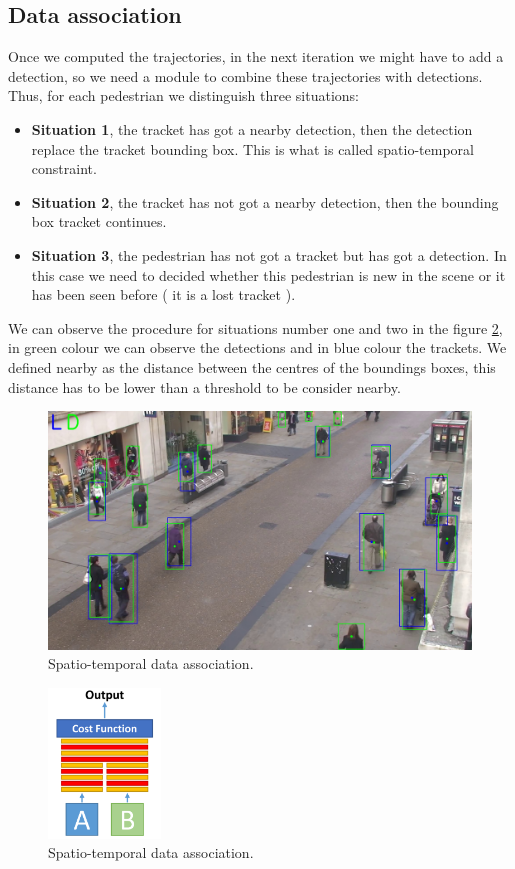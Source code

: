 \subsection{Data association}

Once we computed the trajectories, in the next iteration we might have to add a detection, so we need a module to combine these trajectories with detections. Thus, for each pedestrian we distinguish three situations:

\begin{itemize}



\item \textbf{Situation 1}, the tracket has got a nearby detection, then the detection replace the tracket bounding box. This is what is called spatio-temporal constraint.

\item \textbf{Situation 2}, the tracket has not got a nearby detection, then the bounding box tracket continues.

\item \textbf{Situation 3}, the pedestrian has not got a tracket but has got a detection. In this case we need to decided whether this pedestrian is new in the scene or it has been seen before ( it is a lost tracket ).

\end{itemize}

We can observe the procedure for situations number one and two in the figure \ref{data1}, in green colour we can observe the detections and in blue colour the trackets. We defined nearby as the distance between the centres of the boundings boxes, this distance has to be lower than a threshold to be consider nearby. 

\begin{figure}[hptb]
\centering         
\includegraphics[width=12cm]{lucasKanade/dataAssociation.jpg}
\caption{Spatio-temporal data association.} \label{data1}
\end{figure}


\begin{figure}[hptb]
\centering         
\includegraphics[width=3cm]{siamese/retall2.png}
\caption{Spatio-temporal data association.} \label{data1}
\end{figure}




